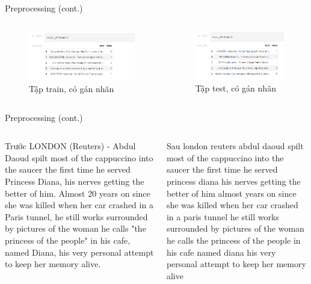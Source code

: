 \documentclass[aspectratio=169,xcolor=dvipsnames]{beamer}
\begin{document}
\begin{frame}{Preprocessing (cont.)}
\begin{columns}[c]
\begin{figure}
\includegraphics[width=0.98\linewidth]{img/train-csv.PNG}
\caption{Tập train, có gán nhãn}
\end{figure}

\begin{figure}
\includegraphics[width=0.9\linewidth]{img/test-csv.PNG}
\caption{Tập test, có gán nhãn}
\end{figure}
\end{columns}
\end{frame}

\begin{frame}{Preprocessing (cont.)}
\begin{columns}[c]

\begin{block}{Trước}
LONDON (Reuters) - Abdul Daoud spilt most of the cappuccino into the saucer the first time he served Princess Diana, his nerves getting the better of him. Almost 20 years on since she was killed when her car crashed in a Paris tunnel, he still works surrounded by pictures of the woman he calls "the princess of the people" in his cafe, named Diana, his very personal attempt to keep her memory alive.
\end{block}
\begin{block}{Sau}
london  reuters    abdul daoud spilt most of the cappuccino into the saucer the first time he served princess diana  his nerves getting the better of him  almost  years on since she was killed when her car crashed in a paris tunnel  he still works surrounded by pictures of the woman he calls  the princess of the people  in his cafe  named diana  his very personal attempt to keep her memory alive 
\end{block}
\end{columns}
\end{frame}
\end{document}
